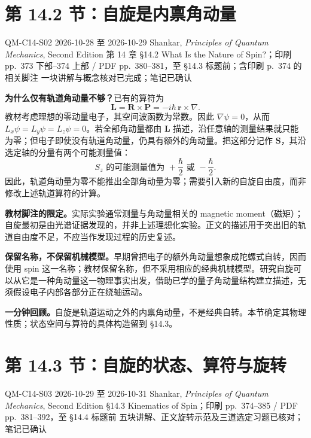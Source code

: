 \section{第 14.2 节：自旋是内禀角动量}
\label{section:QM-C14-S02}
\studymeta
  {QM-C14-S02}
  {2026-10-28 至 2026-10-29}
  {Shankar, \textit{Principles of Quantum Mechanics}, Second Edition}
  {第 14 章 \S 14.2 What Is the Nature of Spin?；印刷 pp.~373 下部--374 上部 / PDF pp.~380--381，至 \S 14.3 标题前；含印刷 p.~374 的相关脚注}
  {一块讲解与概念核对已完成；笔记已确认}


\textbf{为什么仅有轨道角动量不够？}已有的算符为
\begin{equation}
  \mathbf L=\mathbf R\times\mathbf P=-i\hbar\,\mathbf r\times\nabla.
\end{equation}
教材考虑理想的零动量电子，其空间波函数为常数。因此 $\nabla\psi=0$，从而 $L_x\psi=L_y\psi=L_z\psi=0$。若全部角动量都由 $\mathbf L$ 描述，沿任意轴的测量结果就只能为零；但电子即使没有轨道角动量，仍具有额外的角动量。把这部分记作 $\mathbf S$，其沿选定轴的分量有两个可能测量值：
\begin{equation}
  \boxed{S_z\text{ 的可能测量值为 }+\frac{\hbar}{2}\text{ 或 }-\frac{\hbar}{2}.}
\end{equation}
因此，轨道角动量为零不能推出全部角动量为零；需要引入新的自旋自由度，而非修改上述轨道算符的计算。

\textbf{教材脚注的限定。}实际实验通常测量与角动量相关的 magnetic moment（磁矩）；自旋最初是由光谱证据发现的，并非上述理想化实验。正文的描述用于突出旧的轨道自由度不足，不应当作发现过程的历史复述。

\textbf{保留名称，不保留机械模型。}早期曾把电子的额外角动量想象成陀螺式自转，因而使用 spin 这一名称；教材保留名称，但不采用相应的经典机械模型。研究自旋可以从它是一种角动量这一物理事实出发，借助已学的量子角动量结构建立描述，无须假设电子内部各部分正在绕轴运动。


\textbf{一分钟回顾。}自旋是轨道运动之外的内禀角动量，不是经典自转。本节确定其物理性质；状态空间与算符的具体构造留到 \S 14.3。

\section{第 14.3 节：自旋的状态、算符与旋转}
\label{section:QM-C14-S03}
\studymeta
  {QM-C14-S03}
  {2026-10-29 至 2026-10-31}
  {Shankar, \textit{Principles of Quantum Mechanics}, Second Edition}
  {\S 14.3 Kinematics of Spin；印刷 pp.~374--385 / PDF pp.~381--392，至 \S 14.4 标题前}
  {五块讲解、正文旋转示范及三道选定习题已核对；笔记已确认}

